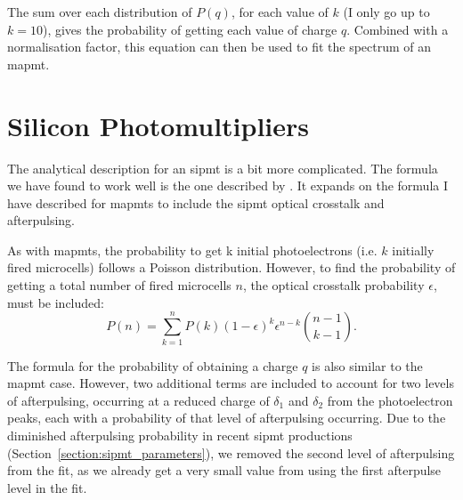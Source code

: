 The sum over each distribution of $P(q)$, for each value of $k$ (I only go up to $k=10$), gives the probability of getting each value of charge $q$. Combined with a normalisation factor, this equation can then be used to fit the spectrum of an \gls{mapmt}.

\section{Silicon Photomultipliers}

The analytical description for an \gls{sipmt} is a bit more complicated. The formula we have found to work well is the one described by \cite{Gentile2010}. It expands on the formula I have described for \glspl{mapmt} to include the \gls{sipmt} optical crosstalk and afterpulsing.

As with \glspl{mapmt}, the probability to get k initial photoelectrons (i.e. $k$ initially fired microcells) follows a Poisson distribution. However, to find the probability of getting a total number of fired microcells $n$, the optical crosstalk probability $\epsilon$, must be included:
\begin{equation}
P(n) = \sum_{k=1}^n P(k) (1 - \epsilon)^k \epsilon^{n-k} \binom{n-1}{k-1}.
\end{equation}

The formula for the probability of obtaining a charge $q$ is also similar to the \gls{mapmt} case. However, two additional terms are included to account for two levels of afterpulsing, occurring at a reduced charge of $\delta_1$ and $\delta_2$ from the photoelectron peaks, each with a probability of that level of afterpulsing occurring. Due to the diminished afterpulsing probability in recent \gls{sipmt} productions (Section~\ref{section:sipmt_parameters}), we removed the second level of afterpulsing from the fit, as we already get a very small value from using the first afterpulse level in the fit.